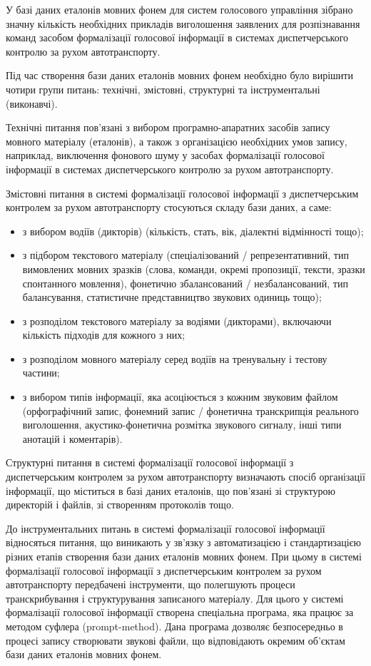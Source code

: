 У базі даних еталонів мовних фонем для систем голосового управління зібрано значну кількість необхідних прикладів виголошення заявлених для розпізнавання команд засобом формалізації голосової інформації в системах диспетчерського контролю за рухом автотранспорту.

Під час створення бази даних еталонів мовних фонем необхідно було вирішити чотири групи питань: технічні, змістовні, структурні та інструментальні (виконавчі).

Технічні питання пов’язані з вибором програмно-апаратних засобів запису мовного матеріалу (еталонів), а також з організацією необхідних умов запису, наприклад, виключення фонового шуму у засобах формалізації голосової інформації в системах диспетчерського контролю за рухом автотранспорту.

Змістовні питання в системі формалізації голосової інформації з диспетчерським контролем за рухом автотранспорту стосуються складу бази даних, а саме:

\begin{itemize}
	\item з вибором водіїв (дикторів) (кількість, стать, вік, діалектні відмінності тощо);
	\item з підбором текстового матеріалу (спеціалізований / репрезентативний, тип вимовлених мовних зразків (слова, команди, окремі пропозиції, тексти, зразки спонтанного мовлення), фонетично збалансований / незбалансований, тип балансування, статистичне представництво звукових одиниць тощо);
	\item з розподілом текстового матеріалу за водіями (дикторами), включаючи кількість підходів для кожного з них;
	\item з розподілом мовного матеріалу серед водіїв на тренувальну і тестову частини;
	\item з вибором типів інформації, яка асоціюється з кожним звуковим файлом (орфографічний запис, фонемний запис / фонетична транскрипція реального виголошення, акустико-фонетична розмітка звукового сигналу, інші типи анотацій і коментарів).
\end{itemize}

Структурні питання в системі формалізації голосової інформації з диспетчерським контролем за рухом автотранспорту визначають спосіб організації інформації, що міститься в базі даних еталонів, що пов’язані зі структурою директорій і файлів, зі створенням протоколів тощо.

До інструментальних питань в системі формалізації голосової інформації відносяться питання, що виникають у зв’язку з автоматизацією і стандартизацією різних етапів створення бази даних еталонів мовних фонем. При цьому в системі формалізації голосової інформації з диспетчерським контролем за рухом автотранспорту передбачені інструменти, що полегшують процеси транскрибування і структурування записаного матеріалу. Для цього у системі формалізації голосової інформації створена спеціальна програма, яка працює за методом суфлера (prompt-method). Дана програма дозволяє безпосередньо в процесі запису створювати звукові файли, що відповідають окремим об’єктам бази даних еталонів мовних фонем.

